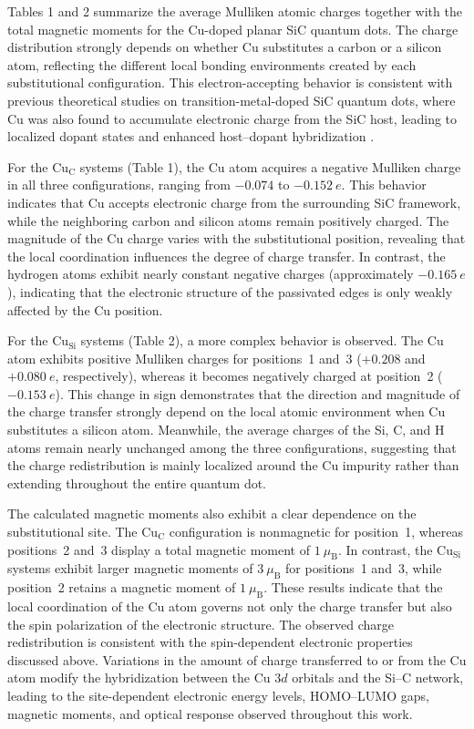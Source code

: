 \documentclass[11pt]{article} %
\begin{document}
Tables 1 and 2 summarize the average Mulliken atomic charges together with the total magnetic moments for the Cu-doped planar SiC quantum dots. The charge distribution strongly depends on whether Cu substitutes a carbon or a silicon atom, reflecting the different local bonding environments created by each substitutional configuration. 
This electron-accepting behavior is consistent with previous theoretical studies on transition-metal-doped SiC quantum dots, where Cu was also found to accumulate electronic charge from the SiC host, leading to localized dopant states and enhanced host–dopant hybridization \cite{Masashi_2011}.

For the Cu$_\mathrm{C}$ systems (Table 1), the Cu atom acquires a negative Mulliken charge in all three configurations, ranging from $-0.074$ to $-0.152~e$. This behavior indicates that Cu accepts electronic charge from the surrounding SiC framework, while the neighboring carbon and silicon atoms remain positively charged. The magnitude of the Cu charge varies with the substitutional position, revealing that the local coordination influences the degree of charge transfer. In contrast, the hydrogen atoms exhibit nearly constant negative charges (approximately $-0.165~e$), indicating that the electronic structure of the passivated edges is only weakly affected by the Cu position.

For the Cu$_\mathrm{Si}$ systems (Table 2), a more complex behavior is observed. The Cu atom exhibits positive Mulliken charges for positions~1 and~3 ($+0.208$ and $+0.080~e$, respectively), whereas it becomes negatively charged at position~2 ($-0.153~e$). This change in sign demonstrates that the direction and magnitude of the charge transfer strongly depend on the local atomic environment when Cu substitutes a silicon atom. Meanwhile, the average charges of the Si, C, and H atoms remain nearly unchanged among the three configurations, suggesting that the charge redistribution is mainly localized around the Cu impurity rather than extending throughout the entire quantum dot.

The calculated magnetic moments also exhibit a clear dependence on the substitutional site. The Cu$_\mathrm{C}$ configuration is nonmagnetic for position~1, whereas positions~2 and~3 display a total magnetic moment of $1~\mu_\mathrm{B}$. In contrast, the Cu$_\mathrm{Si}$ systems exhibit larger magnetic moments of $3~\mu_\mathrm{B}$ for positions~1 and~3, while position~2 retains a magnetic moment of $1~\mu_\mathrm{B}$. These results indicate that the local coordination of the Cu atom governs not only the charge transfer but also the spin polarization of the electronic structure. The observed charge redistribution is consistent with the spin-dependent electronic properties discussed above. Variations in the amount of charge transferred to or from the Cu atom modify the hybridization between the Cu $3d$ orbitals and the Si--C network, leading to the site-dependent electronic energy levels, HOMO--LUMO gaps, magnetic moments, and optical response observed throughout this work.
\end{document}
